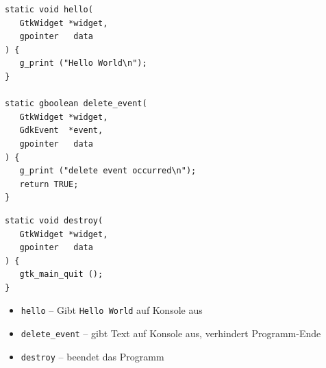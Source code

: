 
\begin{frame}[fragile]
%
\begin{minipage}{.5\linewidth}
\begin{codebox}
\begin{verbatim}
static void hello(
   GtkWidget *widget,
   gpointer   data
) {
   g_print ("Hello World\n");
}

static gboolean delete_event( 
   GtkWidget *widget,
   GdkEvent  *event,
   gpointer   data
) {
   g_print ("delete event occurred\n");
   return TRUE;
}
\end{verbatim}
\end{codebox}
\end{minipage}
%
\begin{minipage}{.49\linewidth}
\begin{codebox}[... Fortsetzung]
\begin{verbatim}
static void destroy( 
   GtkWidget *widget,
   gpointer   data 
) {
   gtk_main_quit ();
}
\end{verbatim}
\end{codebox}
%
\begin{itemize}
\item \texttt{hello} -- Gibt \texttt{Hello World} auf Konsole aus
\item \texttt{delete\_event} -- gibt Text auf Konsole aus, verhindert Programm-Ende
\item \texttt{destroy} -- beendet das Programm
\end{itemize}
\end{minipage}
%
\end{frame}


